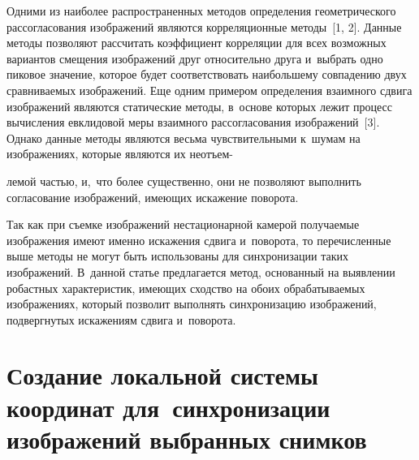 \begin{multicols}{2}
  \vspace*{-2pt}
  
  Одними из наиболее распространенных методов определения 
геометрического рассогласования изображений являются корреляционные 
методы~[1, 2]. Данные методы позволяют рассчитать коэффициент 
корреляции для всех возможных вариантов смещения изображений друг 
относительно друга и~выбрать одно пиковое значение, которое будет 
соответствовать наибольшему совпадению двух сравниваемых изображений. 
Еще одним примером определения взаимного сдвига изображений являются 
статические методы, в~основе которых лежит процесс вычисления 
евклидовой меры взаимного рассогласования изображений~[3]. Однако 
данные методы являются весьма чувствительными к~шумам на 
изображениях, которые являются их неотъем-\linebreak\vspace*{-12pt}

\pagebreak

\noindent
лемой частью, и,~что более 
существенно, они не позволяют выполнить согласование изображений, 
имеющих искажение поворота. 
  
  Так как при съемке изображений нестационарной камерой получаемые 
изображения имеют именно искажения сдвига и~поворота, то пе\-ре\-чис\-лен\-ные 
выше методы не могут быть использованы для синхронизации таких 
изображений. В~данной статье предлагается метод, основанный на 
выявлении робастных характеристик, имеющих сходство на обоих 
обрабатываемых изображениях, который позволит выполнять 
синхронизацию изображений, подвергнутых искажениям сдвига и~поворота. 

\vspace*{-6pt}

  \section{Создание локальной системы координат 
для~синхронизации изображений выбранных снимков}

\vspace*{-2pt}
  

\end{multicols}
